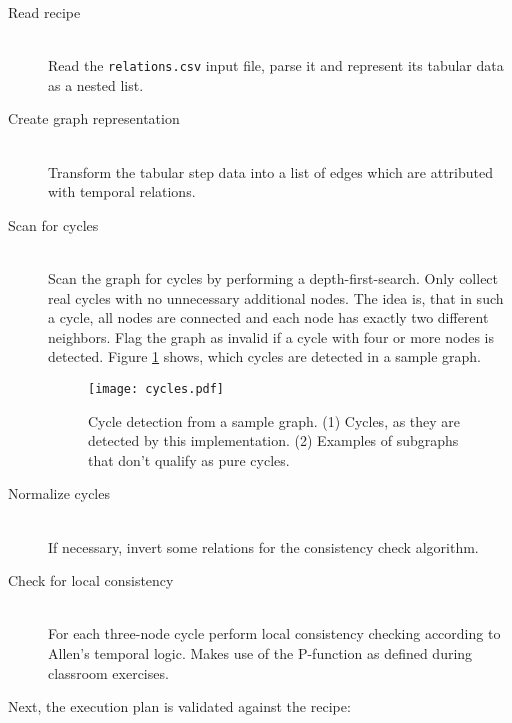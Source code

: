         \begin{description}
            \item[Read recipe] \hfill \\
                Read the \texttt{relations.csv} input file, parse it and
                represent its tabular data as a nested list.
            \item[Create graph representation] \hfill \\
                Transform the tabular step data into a list of edges which are
                attributed with temporal relations.
            \item[Scan for cycles] \hfill \\
                Scan the graph for cycles by performing a depth-first-search.
                Only collect real cycles with no unnecessary additional nodes.
                The idea is, that in such a cycle, all nodes are connected and
                each node has exactly two different neighbors. Flag the graph as
                invalid if a cycle with four or more nodes is detected. Figure
                \ref{fig:cycles} shows, which cycles are detected in a sample
                graph.
    
                \begin{figure}[h]
                  \centering
                  \texttt{[image: cycles.pdf]}
                  \caption[Cycle detection]{Cycle detection from a sample graph.
                  (1) Cycles, as they are detected by this implementation. (2)
                  Examples of subgraphs that don't qualify as pure cycles.}
                  \label{fig:cycles}
                \end{figure}
    
            \item[Normalize cycles] \hfill \\
                If necessary, invert some relations for the consistency check
                algorithm.
            \item[Check for local consistency] \hfill \\
                For each three-node cycle perform local consistency checking
                according to Allen's temporal logic. Makes use of the P-function
                as defined during classroom exercises.
        \end{description}
        
        Next, the execution plan is validated against the recipe:
        
